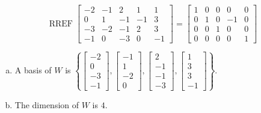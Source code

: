 \begin{exerciseAnswer} 


\[\operatorname{RREF} \left[\begin{array}{ccccc}
-2 & -1 & 2 & 1 & 1 \\
0 & 1 & -1 & -1 & 3 \\
-3 & -2 & -1 & 2 & 3 \\
-1 & 0 & -3 & 0 & -1
\end{array}\right] = \left[\begin{array}{ccccc}
1 & 0 & 0 & 0 & 0 \\
0 & 1 & 0 & -1 & 0 \\
0 & 0 & 1 & 0 & 0 \\
0 & 0 & 0 & 0 & 1
\end{array}\right] \]


\begin{enumerate}[(a)]
\item A basis of \(W\) is \( \left\{ \left[\begin{array}{c}
-2 \\
0 \\
-3 \\
-1
\end{array}\right] , \left[\begin{array}{c}
-1 \\
1 \\
-2 \\
0
\end{array}\right] , \left[\begin{array}{c}
2 \\
-1 \\
-1 \\
-3
\end{array}\right] , \left[\begin{array}{c}
1 \\
3 \\
3 \\
-1
\end{array}\right] \right\} \).
\item The dimension of \(W\) is \( 4 \).
\end{enumerate}
    
\end{exerciseAnswer}
    

